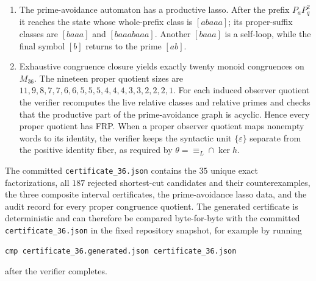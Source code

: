 \documentclass[11pt,a4paper]{article}
\newcommand{\eps}{\varepsilon}
\begin{document}
\begin{enumerate}[leftmargin=2.2em]
      counterexamples for the periodic cases.
\item The prime-avoidance automaton has a productive lasso.  After the
      prefix $P_aP_q^2$ it reaches the state whose whole-prefix class
      is $[abaaa]$; its proper-suffix classes are $[baaa]$ and
      $[baaabaaa]$.  Another $[baaa]$ is a self-loop, while
      the final symbol $[b]$ returns to the prime $[ab]$.
\item\label{check:quotient-minimality} Exhaustive congruence closure yields exactly twenty monoid
      congruences on $M_{36}$.  The nineteen proper quotient sizes are
\(11,9,8,7,7,6,6,5,5,5,4,4,4,3,3,2,2,2,1.\)
      For each induced observer quotient the verifier recomputes the
      live relative classes and relative primes and checks that the
      productive part of the prime-avoidance graph is acyclic.  Hence
      every proper quotient has FRP.  When a proper observer quotient
      maps nonempty words to its identity, the verifier keeps the
      syntactic unit $\{\eps\}$ separate from the positive identity
      fiber, as required by $\theta=\equiv_L\cap\ker h$.
\end{enumerate}

The committed \texttt{certificate\_\allowbreak 36.json} contains the $35$ unique exact factorizations, all $187$ rejected shortest-cut candidates and their counterexamples, the three composite interval certificates, the prime-avoidance lasso data, and the audit record for every proper congruence quotient.  The generated certificate is deterministic and can therefore be compared byte-for-byte with the committed \texttt{certificate\_\allowbreak 36.json} in the fixed repository snapshot, for example by running
\begin{verbatim}
cmp certificate_36.generated.json certificate_36.json
\end{verbatim}
after the verifier completes.
\end{document}
